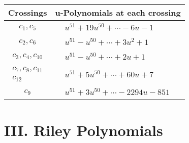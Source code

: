 \documentclass[1p]{elsarticle_modified}
\theoremstyle{definition}
\begin{document}
\begin{tabular}{m{50pt}|m{274pt}}
Crossings & \hspace{64pt}u-Polynomials at each crossing \\
\hline $$\begin{aligned}c_{1},c_{5}\end{aligned}$$&$\begin{aligned}
&u^{51}+19 u^{50}+\cdots-6 u-1
\end{aligned}$\\
\hline $$\begin{aligned}c_{2},c_{6}\end{aligned}$$&$\begin{aligned}
&u^{51}- u^{50}+\cdots+3 u^2+1
\end{aligned}$\\
\hline $$\begin{aligned}c_{3},c_{4},c_{10}\end{aligned}$$&$\begin{aligned}
&u^{51}- u^{50}+\cdots+2 u+1
\end{aligned}$\\
\hline $$\begin{aligned}c_{7},c_{8},c_{11}\\c_{12}\end{aligned}$$&$\begin{aligned}
&u^{51}+5 u^{50}+\cdots+60 u+7
\end{aligned}$\\
\hline $$\begin{aligned}c_{9}\end{aligned}$$&$\begin{aligned}
&u^{51}+3 u^{50}+\cdots-2294 u-851
\end{aligned}$\\
\hline
\end{tabular}\newpage\renewcommand{\arraystretch}{1}
\centering \section*{ III. Riley Polynomials}
\end{document}
